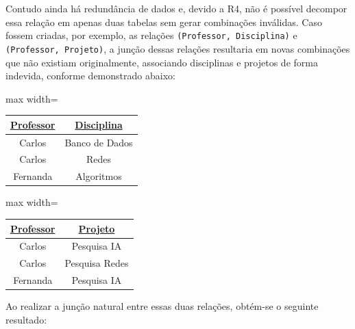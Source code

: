 \begin{tcolorbox}[breakable, colback=blue!5,colframe=blue!40!black,title=Situação exemplo]
    Contudo ainda há redundância de dados e, devido a R4, não é possível decompor essa relação em apenas duas tabelas sem gerar combinações inválidas. Caso fossem criadas, por exemplo, as relações \texttt{(Professor, Disciplina)} e \texttt{(Professor, Projeto)}, a junção dessas relações resultaria em novas combinações que não existiam originalmente, associando disciplinas e projetos de forma indevida, conforme demonstrado abaixo:

    \vspace{0.4cm}

    \centering
    \renewcommand{\arraystretch}{1.2}

    \begin{adjustbox}{max width=\textwidth}
    \begin{tabular}{|c|c|}
    \hline
    \textbf{\underline{Professor}} & \textbf{\underline{Disciplina}} \\ \hline
    Carlos & Banco de Dados \\ \hline
    Carlos & Redes \\ \hline
    Fernanda & Algoritmos \\ \hline
    \end{tabular}
\end{adjustbox}
    \vspace{0.3cm}

    \begin{adjustbox}{max width=\textwidth}
    \begin{tabular}{|c|c|}
    \hline
    \textbf{\underline{Professor}} & \textbf{\underline{Projeto}} \\ \hline
    Carlos & Pesquisa IA \\ \hline
    Carlos & Pesquisa Redes \\ \hline
    Fernanda & Pesquisa IA \\ \hline
    \end{tabular}
\end{adjustbox}
    \vspace{0.4cm}

    \justify

    Ao realizar a junção natural entre essas duas relações, obtém-se o seguinte resultado:

    \centering
    \vspace{0.4cm}


\end{tcolorbox}
